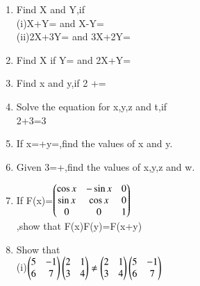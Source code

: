 \begin{enumerate}[label=\arabic*.,ref=\thesubsection.\theenumi]
\solution 

\item Find X and Y,if\\
(i)X+Y= and X-Y=\\
(ii)2X+3Y= and 3X+2Y=\\ 
\solution 

\item Find X if Y= and 2X+Y=\\
\solution 

\item Find x and y,if 2 +=\\
\item Solve the equation for x,y,z and t,if \\
2+3=3\\
\item If x=+y=,find the values of x and y.\\
\item Given 3=+,find the values of x,y,z and w.\\
\item If F(x)=$\begin{pmatrix}\cos x &-\sin x &0\\ \sin x &\cos x &0\\0 &0 &1\end{pmatrix}$\\,show that F(x)F(y)=F(x+y)\\
\solution 

\item Show that\\
(i)$\begin{pmatrix}5 &-1\\6 &7\end{pmatrix}\begin{pmatrix}2 &1\\3 &4\end{pmatrix}\neq\begin{pmatrix}2 &1\\3 &4\end{pmatrix}\begin{pmatrix}5 &-1\\6 &7\end{pmatrix}$

\end{enumerate}
